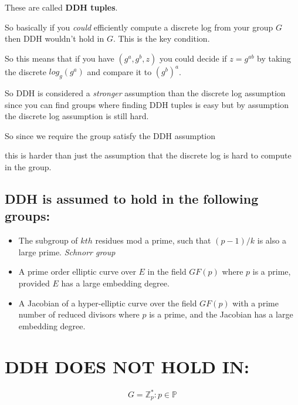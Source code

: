 \documentclass[10pt]{article}
\begin{document}
These are called \textbf{DDH tuples}.

So basically if you \emph{could} efficiently compute a discrete log from your group $G$ then DDH wouldn't hold in $G$. This is the key condition.

So this means that if you have $(g^a, g^b, z)$ 
you could decide if $z=g^{ab}$ by taking the discrete $log_{g}(g^a)$ 
and compare it to $(g^{b})^{a}$.

So DDH is considered a \emph{stronger} assumption than the discrete log assumption 
since you can find groups where finding DDH tuples is easy 
but by assumption the discrete log assumption is still hard. 

So since we require the group satisfy the DDH assumption 

this is harder than just the assumption that the discrete log is hard to compute in the group.

\subsection*{DDH is assumed to hold in the following groups:}

\begin{itemize}
	\item The subgroup of $kth$ residues mod a prime, such that $(p-1)/k$ is also a large prime. \emph{Schnorr group}
	\item A prime order elliptic curve over $E$ in the field $GF(p)$ where $p$ is a prime, provided $E$ has a large embedding degree.
	\item A Jacobian of a hyper-elliptic curve over the field $GF(p)$ with a prime number of reduced divisors where $p$ is a prime, and the Jacobian has a large embedding degree.
\end{itemize}

\section*{DDH DOES NOT HOLD IN:} 
\[G = \mathbb{Z}^{*}_{p} : p \in \mathbb{P}\]
\end{document}
